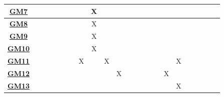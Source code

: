 \documentclass[12pt, titlepage]{article}
\begin{document}
\begin{table}[H]
\begin{adjustwidth}{-1.57in}{-1in}
{\begin{tabular}{c|c|c|c|c|c|c|c|c|c|c|c|c|c|c|c|c|c|c|c|c|c|c|}
\multicolumn{1}{|c|}{\hyperref[Test-GM7]{\textbf{GM7}}} &              &              &              &              &              &              &              &      X        &              &              &              &              &              &              &             &             &             &         & & & &     \\ \hline
\multicolumn{1}{|c|}{\hyperref[Test-GM8]{\textbf{GM8}}} &              &              &              &              &              &              &              &       X       &              &              &              &              &              &              &             &             &             &          & & & &    \\ \hline
\multicolumn{1}{|c|}{\hyperref[Test-GM9]{\textbf{GM9}}} &              &              &              &              &              &              &              &      X        &              &              &              &              &              &              &             &             &             &         & & & &     \\ \hline
\multicolumn{1}{|c|}{\hyperref[Test-GM10]{\textbf{GM10}}} &              &              &              &              &              &              &              &     X         &              &              &              &              &              &              &             &             &             &           & & & &   \\ \hline
\multicolumn{1}{|c|}{\hyperref[Test-GM11]{\textbf{GM11}}} &              &              &              &              &              &              &       X       &              &        X      &              &              &              &              &             &             &            &       X      &            & & & &  \\ \hline
\multicolumn{1}{|c|}{\hyperref[Test-GM12]{\textbf{GM12}}} &              &              &              &              &              &             &              &              &              &      X        &              &              &              &              &             &           X  &             &            & & & &  \\ \hline
\multicolumn{1}{|c|}{\hyperref[Test-GM13]{\textbf{GM13}}} &              &              &              &              &              &             &              &              &              &              &              &              &              &              &             &             &        X     &           & & & &   \\ \hline

\end{tabular}}
\end{adjustwidth}
\end{table}
\end{document}

